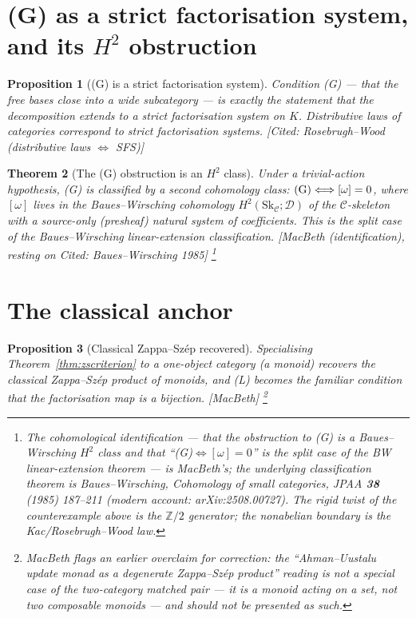 \documentclass[11pt,a4paper]{book}
\theoremstyle{plain}
\newtheorem{Theorem}{Theorem}[chapter]
\newtheorem{Proposition}[Theorem]{Proposition}
\theoremstyle{definition}
\theoremstyle{remark}
\newcommand{\prov}[1]{\hfill\textsf{\footnotesize[#1]}}
\begin{document}
\section{(G) as a strict factorisation system, and its $H^2$ obstruction}

\begin{Proposition}[(G) is a strict factorisation system]\label{prop:sfs}
Condition (G) --- that the free bases close into a wide subcategory --- is exactly
the statement that the decomposition extends to a \emph{strict factorisation
system} on $K$. Distributive laws of categories correspond to strict factorisation
systems.
\prov{Cited: Rosebrugh--Wood (distributive laws $\Longleftrightarrow$ SFS)}
\end{Proposition}

\begin{Theorem}[The (G) obstruction is an $H^2$ class]\label{thm:h2}
Under a trivial-action hypothesis, (G) is classified by a second cohomology class:
$\textup{(G)}\Longleftrightarrow[\omega]=0$, where $[\omega]$ lives in the
\emph{Baues--Wirsching} cohomology $H^2(\mathrm{Sk}_{\mathcal C};\mathcal D)$ of the
$\mathcal C$-skeleton with a source-only (presheaf) natural system of coefficients.
This is the split case of the Baues--Wirsching linear-extension classification.
\prov{MacBeth (identification), resting on Cited: Baues--Wirsching 1985}%
\footnote{The cohomological \emph{identification} --- that the obstruction to (G)
is a Baues--Wirsching $H^2$ class and that ``(G)$\Leftrightarrow[\omega]=0$'' is the
split case of the BW linear-extension theorem --- is MacBeth's; the underlying
classification theorem is Baues--Wirsching, \emph{Cohomology of small categories},
JPAA \textbf{38} (1985) 187--211 (modern account: arXiv:2508.00727). The rigid
twist of the counterexample above is the $\mathbb Z/2$ generator; the nonabelian
boundary is the Kac/Rosebrugh--Wood law.}
\end{Theorem}

\section{The classical anchor}

\begin{Proposition}[Classical Zappa--Sz\'ep recovered]\label{prop:monoidanchor}
Specialising Theorem~\ref{thm:zscriterion} to a one-object category (a monoid)
recovers the classical Zappa--Sz\'ep product of monoids, and (L) becomes the
familiar condition that the factorisation map is a bijection.
\prov{MacBeth}%
\footnote{MacBeth flags an earlier \emph{over}claim for correction: the
``Ahman--Uustalu update monad as a degenerate Zappa--Sz\'ep product'' reading is
\emph{not} a special case of the two-category matched pair --- it is a monoid acting
on a set, not two composable monoids --- and should not be presented as such.}
\end{Proposition}
\end{document}
